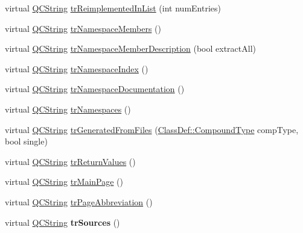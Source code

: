 \begin{DoxyCompactItemize}
\item 
virtual \mbox{\hyperlink{class_q_c_string}{Q\+C\+String}} \mbox{\hyperlink{class_translator_arabic_ab3ae400f56c2865c3c7342f02602035d}{tr\+Reimplemented\+In\+List}} (int num\+Entries)
\item 
virtual \mbox{\hyperlink{class_q_c_string}{Q\+C\+String}} \mbox{\hyperlink{class_translator_arabic_a165f528cf438e8258be63bf31529d5ba}{tr\+Namespace\+Members}} ()
\item 
virtual \mbox{\hyperlink{class_q_c_string}{Q\+C\+String}} \mbox{\hyperlink{class_translator_arabic_a858be185447774aad0de46653d323c90}{tr\+Namespace\+Member\+Description}} (bool extract\+All)
\item 
virtual \mbox{\hyperlink{class_q_c_string}{Q\+C\+String}} \mbox{\hyperlink{class_translator_arabic_ae9eed5c2d22d24d59a2cb6c0cdca53dd}{tr\+Namespace\+Index}} ()
\item 
virtual \mbox{\hyperlink{class_q_c_string}{Q\+C\+String}} \mbox{\hyperlink{class_translator_arabic_aa157f3ffdd040f965526955e65f023e6}{tr\+Namespace\+Documentation}} ()
\item 
virtual \mbox{\hyperlink{class_q_c_string}{Q\+C\+String}} \mbox{\hyperlink{class_translator_arabic_a3b13e16742b3abf9aaec6c0a3911da95}{tr\+Namespaces}} ()
\item 
virtual \mbox{\hyperlink{class_q_c_string}{Q\+C\+String}} \mbox{\hyperlink{class_translator_arabic_ab6b9b20ba86764e71700e42c1fe12946}{tr\+Generated\+From\+Files}} (\mbox{\hyperlink{class_class_def_ae70cf86d35fe954a94c566fbcfc87939}{Class\+Def\+::\+Compound\+Type}} comp\+Type, bool single)
\item 
virtual \mbox{\hyperlink{class_q_c_string}{Q\+C\+String}} \mbox{\hyperlink{class_translator_arabic_adfcbf3e24fe5eaedd86fbfddbdcb7e42}{tr\+Return\+Values}} ()
\item 
virtual \mbox{\hyperlink{class_q_c_string}{Q\+C\+String}} \mbox{\hyperlink{class_translator_arabic_a593eb2a9c452c8e2eb1c59b39cd9ddb7}{tr\+Main\+Page}} ()
\item 
virtual \mbox{\hyperlink{class_q_c_string}{Q\+C\+String}} \mbox{\hyperlink{class_translator_arabic_a3f633770ce93f1d2b3a1fc2fbd375101}{tr\+Page\+Abbreviation}} ()
\item 
\mbox{\label{class_translator_arabic_ae2fcf278dd6cc87d179f1af0f5511cf3}} 
virtual \mbox{\hyperlink{class_q_c_string}{Q\+C\+String}} {\bfseries tr\+Sources} ()
\item 
\mbox{\label{class_translator_arabic_abcab840608ff6adca64d294666924f12}} 

\end{DoxyCompactItemize}
